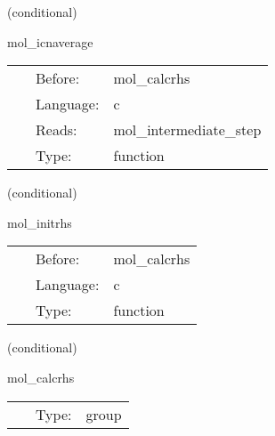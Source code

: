 \vspace{5mm}

   (conditional) 

\hspace{5mm} mol\_icnaverage 

\hspace{5mm}{\it averages the time levels for the averaging icn method } 


\hspace{5mm}

 \begin{tabular*}{160mm}{cll} 
~ & Before:  & mol\_calcrhs \\ 
~ & Language:  & c \\ 
~ & Reads:  & mol\_intermediate\_step \\ 
~ & Type:  & function \\ 
\end{tabular*} 


\vspace{5mm}

   (conditional) 

\hspace{5mm} mol\_initrhs 

\hspace{5mm}{\it initialise the rhs functions } 


\hspace{5mm}

 \begin{tabular*}{160mm}{cll} 
~ & Before:  & mol\_calcrhs \\ 
~ & Language:  & c \\ 
~ & Type:  & function \\ 
\end{tabular*} 


\vspace{5mm}

   (conditional) 

\hspace{5mm} mol\_calcrhs 

\hspace{5mm}{\it physics thorns schedule the calculation of the discrete spatial operator in here } 


\hspace{5mm}

 \begin{tabular*}{160mm}{cll} 
~ & Type:  & group \\ 
\end{tabular*} 



